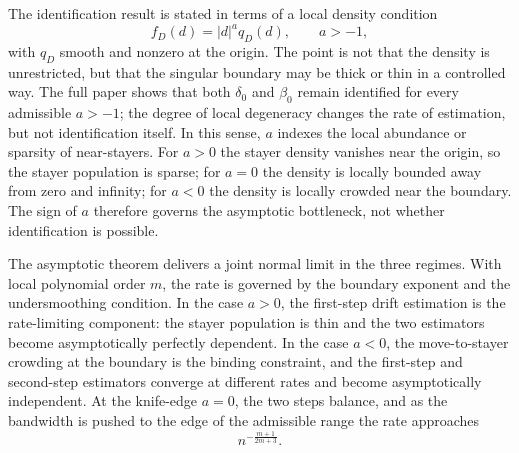 \documentclass{article}
\begin{document}
The identification result is stated in terms of a local density condition
\begin{equation}
 f_D(d)=|d|^{a}q_D(d),\qquad a>-1,
\end{equation}
with $q_D$ smooth and nonzero at the origin. The point is not that the density is unrestricted, but that the singular boundary may be thick or thin in a controlled way. The full paper shows that both $\delta_0$ and $\beta_0$ remain identified for every admissible $a>-1$; the degree of local degeneracy changes the rate of estimation, but not identification itself. In this sense, $a$ indexes the local abundance or sparsity of near-stayers. For $a>0$ the stayer density vanishes near the origin, so the stayer population is sparse; for $a=0$ the density is locally bounded away from zero and infinity; for $a<0$ the density is locally crowded near the boundary. The sign of $a$ therefore governs the asymptotic bottleneck, not whether identification is possible.

The asymptotic theorem delivers a joint normal limit in the three regimes. With local polynomial order $m$, the rate is governed by the boundary exponent and the undersmoothing condition. In the case $a>0$, the first-step drift estimation is the rate-limiting component: the stayer population is thin and the two estimators become asymptotically perfectly dependent. In the case $a<0$, the move-to-stayer crowding at the boundary is the binding constraint, and the first-step and second-step estimators converge at different rates and become asymptotically independent. At the knife-edge $a=0$, the two steps balance, and as the bandwidth is pushed to the edge of the admissible range the rate approaches
\begin{equation}
 n^{-\frac{m+1}{2m+3}}.
\end{equation}
\end{document}
